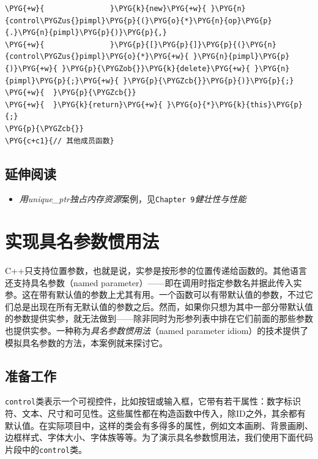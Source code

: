 \begin{codeblockbg}
\begin{Verbatim}[commandchars=\\\{\},breaklines=true,breakanywhere=true,fontsize=\codefont,xleftmargin=17bp]
\PYG{+w}{               }\PYG{k}{new}\PYG{+w}{ }\PYG{n}{control\PYGZus{}pimpl}\PYG{p}{(}\PYG{o}{*}\PYG{n}{op}\PYG{p}{.}\PYG{n}{pimpl}\PYG{p}{)}\PYG{p}{,}
\PYG{+w}{               }\PYG{p}{[}\PYG{p}{]}\PYG{p}{(}\PYG{n}{control\PYGZus{}pimpl}\PYG{o}{*}\PYG{+w}{ }\PYG{n}{pimpl}\PYG{p}{)}\PYG{+w}{ }\PYG{p}{\PYGZob{}}\PYG{k}{delete}\PYG{+w}{ }\PYG{n}{pimpl}\PYG{p}{;}\PYG{+w}{ }\PYG{p}{\PYGZcb{}}\PYG{p}{)}\PYG{p}{;}
\PYG{+w}{  }\PYG{p}{\PYGZcb{}}
\PYG{+w}{  }\PYG{k}{return}\PYG{+w}{ }\PYG{o}{*}\PYG{k}{this}\PYG{p}{;}
\PYG{p}{\PYGZcb{}}
\PYG{c+c1}{// 其他成员函数}
\end{Verbatim}
\end{codeblockbg}



\subsection{延伸阅读}



\begin{itemize}
\item \textit{用unique\_ptr独占内存资源}案例，见\texttt{Chapter 9}\textit{健壮性}\textit{与性能}

\end{itemize}



\section{实现具名参数惯用法}


C++只支持位置参数，也就是说，实参是按形参的位置传递给函数的。其他语言还支持具名参数（named parameter）——即在调用时指定参数名并据此传入实参。这在带有默认值的参数上尤其有用。一个函数可以有带默认值的参数，不过它们总是出现在所有无默认值的参数之后。然而，如果你只想为其中一部分带默认值的参数提供实参，就无法做到——除非同时为形参列表中排在它们前面的那些参数也提供实参。一种称为\textit{具名参数惯用法}（named parameter idiom）的技术提供了模拟具名参数的方法，本案例就来探讨它。



\subsection{准备工作}



\texttt{control}类表示一个可视控件，比如按钮或输入框，它带有若干属性：数字标识符、文本、尺寸和可见性。这些属性都在构造函数中传入，除ID之外，其余都有默认值。在实际项目中，这样的类会有多得多的属性，例如文本画刷、背景画刷、边框样式、字体大小、字体族等等。为了演示具名参数惯用法，我们使用下面代码片段中的\texttt{control}类。


